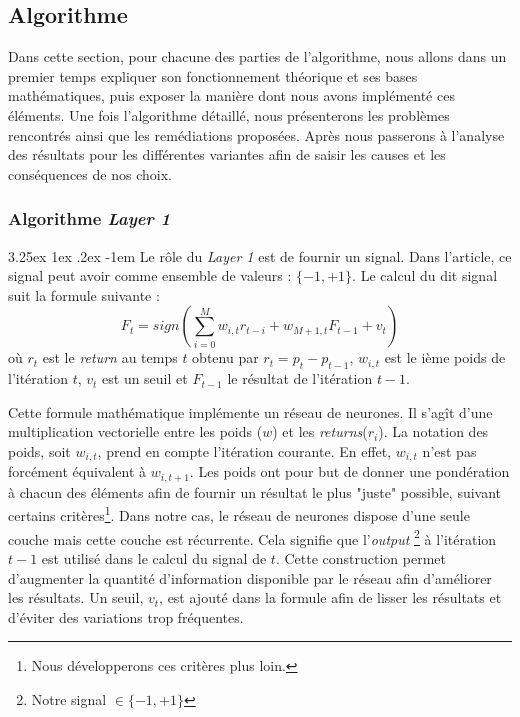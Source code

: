 \documentclass[a4paper, 11pt]{article}
\makeatletter
\renewcommand\paragraph{\@startsection{paragraph}{5}{\z@}%
  {3.25ex \@plus1ex \@minus.2ex}%
  {-1em}%
  {\normalfont\normalsize\bfseries}}
\makeatother
\begin{document}
\subsection{Algorithme}
Dans cette section, pour chacune des parties de l'algorithme, nous allons dans un premier temps expliquer son fonctionnement théorique et ses bases
mathématiques, puis exposer la manière dont nous avons implémenté ces éléments.
Une fois l'algorithme détaillé, nous présenterons les problèmes rencontrés ainsi que les remédiations proposées. Après nous passerons à l'analyse des
résultats pour les différentes variantes afin de saisir les causes et les conséquences de nos choix.


\subsubsection{Algorithme \textit{Layer 1}}
\paragraph{}
Le rôle du \textit{Layer 1} est de fournir un signal. Dans l'article, ce signal peut avoir comme ensemble de valeurs : $\{-1,+1\}$. Le calcul du dit
signal suit la formule suivante \cite{fx_trading}:
$$F_t = sign(\sum_{i=0}^M w_{i,t} r_{t-i} + w_{M+1,t} F_{t-1} + v_t)$$
où $r_t$ est le \textit{return} au temps $t$ obtenu par $r_t = p_t - p_{t-1}$, $w_{i,t}$ est le ième poids de l'itération $t$, $v_t$ est un seuil et $F_{t-1}$ le résultat de l'itération $t-1$.

Cette formule mathématique implémente un réseau de neurones. Il s'agît d'une multiplication vectorielle entre les poids ($w$) et les \textit{returns}($r_i$). La notation des poids, soit $w_{i,t}$, prend en compte l'itération courante. En effet, $w_{i,t}$ n'est pas forcément équivalent à $w_{i,t+1}$. Les poids ont pour but de donner une pondération à chacun des éléments afin de fournir un résultat le plus "juste" possible, suivant certains
critères\footnote{Nous développerons ces critères plus loin.}.
Dans notre cas, le réseau de neurones dispose d'une seule couche mais cette couche est récurrente. Cela signifie que l'\textit{output}
\footnote{Notre signal $\in \{-1,+1\}$} à l'itération $t-1$ est utilisé dans le calcul du signal de $t$. Cette construction permet d'augmenter
la quantité d'information disponible par le réseau afin d'améliorer les résultats.
Un seuil, $v_t$, est ajouté dans la formule afin de lisser les résultats et d'éviter des variations trop fréquentes.
\end{document}
